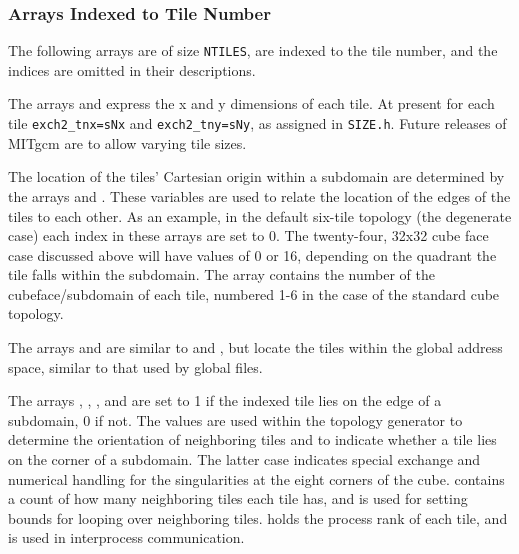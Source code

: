 \subsubsection{Arrays Indexed to Tile Number}

The following arrays are of size \texttt{NTILES}, are indexed to the
tile number, and the indices are omitted in their descriptions.

The arrays  and
 express the x and y dimensions of each
tile.  At present for each tile \texttt{exch2\_tnx=sNx} and
\texttt{exch2\_tny=sNy}, as assigned in \texttt{SIZE.h}.  Future
releases of MITgcm are to allow varying tile sizes.

The location of the tiles' Cartesian origin within a subdomain are
determined by the arrays  and
.  These variables are used to
relate the location of the edges of the tiles to each other.  As an
example, in the default six-tile topology (the degenerate case) each
index in these arrays are set to 0.  The twenty-four, 32x32 cube face
case discussed above will have values of 0 or 16, depending on the
quadrant the tile falls within the subdomain.  The array 
 contains the number of the
cubeface/subdomain of each tile, numbered 1-6 in the case of the
standard cube topology.

The arrays  and
 are similar to
 and
, but locate the tiles within the
global address space, similar to that used by global files.

The arrays ,
,
, and
 are set to 1 if the indexed
tile lies on the edge of a subdomain, 0 if not.  The values are used
within the topology generator to determine the orientation of
neighboring tiles and to indicate whether a tile lies on the corner of
a subdomain.  The latter case indicates special exchange and numerical
handling for the singularities at the eight corners of the cube.
 contains a count of
how many neighboring tiles each tile has, and is used for setting
bounds for looping over neighboring tiles.
 holds the process rank of each
tile, and is used in interprocess communication.

